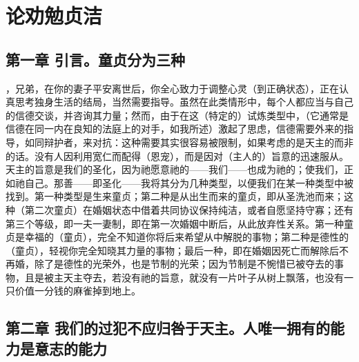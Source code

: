 
\chapter{论劝勉贞洁}



\section{第一章 引言。童贞分为三种}

，兄弟，在你的妻子平安离世后，你全心致力于调整心灵（到正确状态），正在认真思考独身生活的结局，当然需要指导。虽然在此类情形中，每个人都应当与自己的信德交谈，并咨询其力量；然而，由于在这（特定的）试炼类型中，（它通常是信德在同一内在良知的法庭上的对手，如我所述）激起了思虑，信德需要外来的指导，如同辩护者，来对抗：这种需要其实很容易被限制，如果考虑的是天主的而非的话。没有人因利用宽仁而配得（恩宠），而是因对（主人的）旨意的迅速服从。天主的旨意是我们的圣化，因为祂愿意祂的——我们——也成为祂的；使我们，正如祂自己。那善——即圣化——我将其分为几种类型，以便我们在某一种类型中被找到。第一种类型是生来童贞；第二种是从出生而来的童贞，即从圣洗池而来；这种（第二次童贞）在婚姻状态中借着共同协议保持纯洁，或者自愿坚持守寡；还有第三个等级，即一夫一妻制，即在第一次婚姻中断后，从此放弃性关系。第一种童贞是幸福的（童贞），完全不知道你将后来希望从中解脱的事物；第二种是德性的（童贞），轻视你完全知晓其力量的事物；最后一种，即在婚姻因死亡而解除后不再婚，除了是德性的光荣外，也是节制的光荣；因为节制是不惋惜已被夺去的事物，且是被主天主夺去，若没有祂的旨意，就没有一片叶子从树上飘落，也没有一只价值一分钱的麻雀掉到地上。\par


\section{第二章 我们的过犯不应归咎于天主。人唯一拥有的能力是意志的能力}

